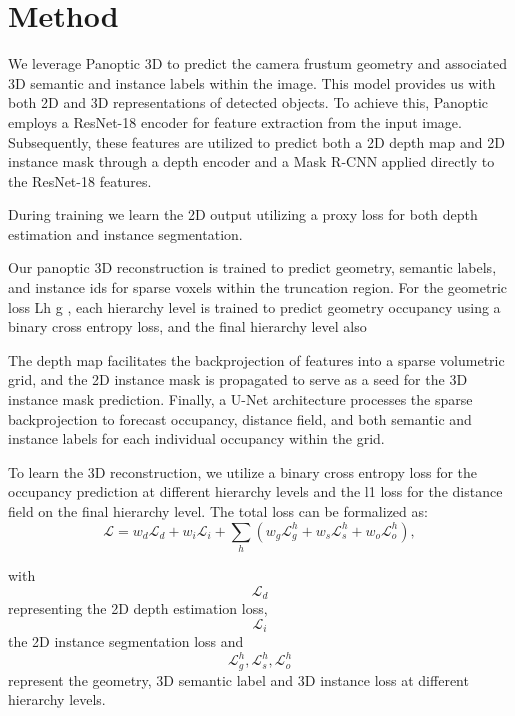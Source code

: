 \section{Method}
\label{sec:method}

We leverage Panoptic 3D \cite{dahnert2021panoptic} to predict the camera frustum geometry and associated 3D semantic and instance labels within the image. This model provides us with both 2D and 3D representations of detected objects. To achieve this, Panoptic employs a ResNet-18 encoder for feature extraction from the input image. Subsequently, these features are utilized to predict both a 2D depth map and 2D instance mask through a depth encoder and a Mask R-CNN applied directly to the ResNet-18 features. 

During training we learn the 2D output utilizing a proxy loss for both depth estimation and instance segmentation.

Our panoptic 3D reconstruction is trained to predict geometry, semantic labels, and instance ids for
sparse voxels within the truncation region. For the geometric loss Lh
g , each hierarchy level is trained
to predict geometry occupancy using a binary cross entropy loss, and the final hierarchy level also

The depth map facilitates the backprojection of features into a sparse volumetric grid, and the 2D instance mask is propagated to serve as a seed for the 3D instance mask prediction. Finally, a U-Net architecture processes the sparse backprojection to forecast occupancy, distance field, and both semantic and instance labels for each individual occupancy within the grid.

To learn the 3D reconstruction, we utilize a binary cross entropy loss for the occupancy prediction at different hierarchy levels and the l1 loss for the distance field on the final hierarchy level.
The total loss can be formalized as: \begin{equation}
    \mathcal{L} = w_d \mathcal{L}_d + w_i \mathcal{L}_i + \sum_h (w_g \mathcal{L}_g^h + w_s \mathcal{L}_s^h + w_o \mathcal{L}_o^h),
\end{equation}

with \begin{equation} \mathcal{L}_d \end{equation} representing the 2D depth estimation loss, \begin{equation} \mathcal{L}_i \end{equation} the 2D instance segmentation loss and \begin{equation}  \mathcal{L}_g^h, \mathcal{L}_s^h, \mathcal{L}_o^h \end{equation} represent the geometry, 3D semantic label and 3D instance loss at different hierarchy levels.

